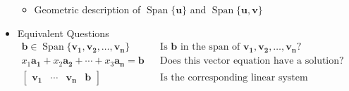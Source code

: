 \documentclass[10pt]{book}
\newenvironment{boxdef}{\begin{mdframed}[backgroundcolor=gray!30,linewidth=0pt,nobreak=true]}{\end{mdframed}}
\newcommand{\vect}[1]{\ensuremath{\boldsymbol{\mathbf{#1}}}}
\DeclareMathOperator{\Span}{Span}
\begin{document}
\begin{itemize}
\begin{boxdef}
		\end{boxdef}
		\begin{itemize}
			\item Geometric description of $\Span\{\vect{u}\}$ and $\Span\{\vect{u},\vect{v}\}$
		\end{itemize}
	\item Equivalent Questions
		\begin{align*}
		\vect{b}\in\Span\{\vect{v_1},\vect{v_2},\ldots,\vect{v_n}\}
			&& \text{Is $\vect{b}$ in the span of $\vect{v_1},\vect{v_2},\ldots,\vect{v_n}$?} \\
		x_1\vect{a_1}+x_2\vect{a_2}+\cdots+x_3\vect{a_n}=\vect{b}
			&& \text{Does this vector equation have a solution?} \\
		\begin{bmatrix}\vect{v_1}&\cdots&\vect{v_n}&\vect{b}\end{bmatrix}
			&& \text{Is the corresponding linear system consistent?}
		\end{align*}
\end{itemize}


\newpage


\end{document}
